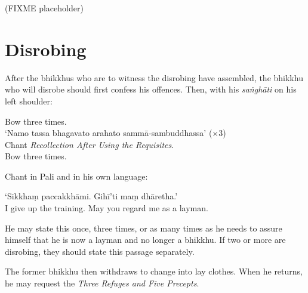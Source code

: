 (FIXME placeholder)

\section{Disrobing}

After the bhikkhus who are to witness the disrobing have assembled, the bhikkhu
who will disrobe should first confess his offences. Then, with his
\emph{saṅghāti} on his left shoulder:

Bow three times.\\
‘Namo tassa bhagavato arahato sammā-sambuddhassa’ (×3)\\
Chant \emph{Recollection After Using the Requisites}.\\
Bow three times.

Chant in Pali and in his own language:

‘Sikkhaṃ paccakkhāmi. Gihī'ti maṃ dhāretha.’\\
I give up the training. May you regard me as a layman.

He may state this once, three times, or as many times as he needs to assure
himself that he is now a layman and no longer a bhikkhu. If two or more are
disrobing, they should state this passage separately.

The former bhikkhu then withdraws to change into lay clothes. When he returns,
he may request the \emph{Three Refuges and Five Precepts}.

